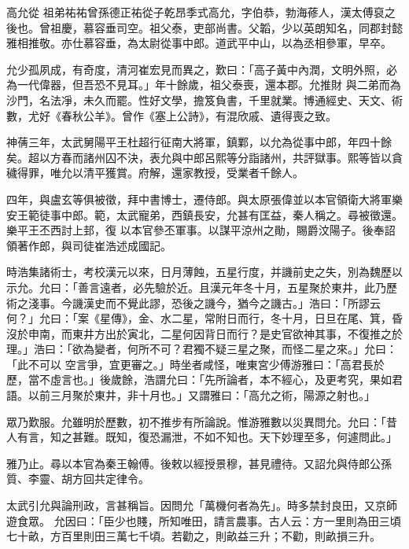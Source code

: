 
\begin{pinyinscope}

 高允從
 祖弟祐祐曾孫德正祐從子乾昂季式高允，字伯恭，勃海蓚人，漢太傅裒之後也。曾祖慶，慕容垂司空。祖父泰，吏部尚書。父韜，少以英朗知名，同郡封懿雅相推敬。亦仕慕容垂，為太尉從事中郎。道武平中山，以為丞相參軍，早卒。



 允少孤夙成，有奇度，清河崔宏見而異之，歎曰：「高子黃中內潤，文明外照，必為一代偉器，但吾恐不見耳。」年十餘歲，祖父泰喪，還本郡。允推財
 與二弟而為沙門，名法凈，未久而罷。性好文學，擔笈負書，千里就業。博通經史、天文、術數，尤好《春秋公羊》。曾作《塞上公詩》，有混欣戚、遺得喪之致。



 神蒨三年，太武舅陽平王杜超行征南大將軍，鎮鄴，以允為從事中郎，年四十餘矣。超以方春而諸州囚不決，表允與中郎呂熙等分詣諸州，共評獄事。熙等皆以貪穢得罪，唯允以清平獲賞。府解，還家教授，受業者千餘人。



 四年，與盧玄等俱被徵，拜中書博士，遷侍郎。與太原張偉並以本官領衛大將軍樂安王範徒事中郎。範，太武寵弟，西鎮長安，允甚有匡益，秦人稱之。尋被徵還。樂平王丕西討上邽，復
 以本官參丕軍事。以謀平涼州之勛，賜爵汶陽子。後奉詔領著作郎，與司徒崔浩述成國記。



 時浩集諸術士，考校漢元以來，日月薄蝕，五星行度，并譏前史之失，別為魏歷以示允。允曰：「善言遠者，必先驗於近。且漢元年冬十月，五星聚於東井，此乃歷術之淺事。今譏漢史而不覺此謬，恐後之譏今，猶今之譏古。」浩曰：「所謬云何？」允曰：「案《星傳》，金、水二星，常附日而行，冬十月，日旦在尾、箕，昏沒於申南，而東井方出於寅北，二星何因背日而行？是史官欲神其事，不復推之於理。」浩曰：「欲為變者，何所不可？君獨不疑三星之聚，而怪二星之來。」允曰：「此不可以
 空言爭，宜更審之。」時坐者咸怪，唯東宮少傅游雅曰：「高君長於歷，當不虛言也。」後歲餘，浩謂允曰：「先所論者，本不經心，及更考究，果如君語。以前三月聚於東井，非十月也。」又謂雅曰：「高允之術，陽源之射也。」



 眾乃歎服。允雖明於歷數，初不推步有所論說。惟游雅數以災異問允。允曰：「昔人有言，知之甚難。既知，復恐漏泄，不如不知也。天下妙理至多，何遽問此。」



 雅乃止。尋以本官為秦王翰傅。後敕以經授景穆，甚見禮待。又詔允與侍郎公孫質、李靈、胡方回共定律令。



 太武引允與論刑政，言甚稱旨。因問允「萬機何者為先」。時多禁封良田，又京師遊食眾。
 允因曰：「臣少也賤，所知唯田，請言農事。古人云：方一里則為田三頃七十畝，方百里則田三萬七千頃。若勸之，則畝益三升；不勸，則畝損三升。




\end{pinyinscope}

